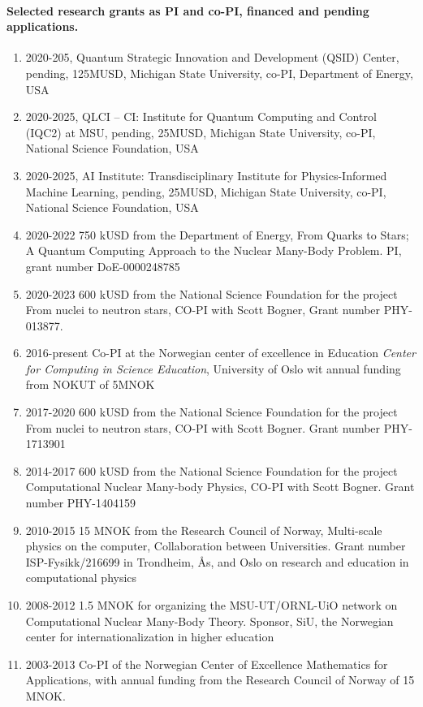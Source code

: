 \documentclass[%
oneside,                 %
final,                   %
10pt]{article}
\begin{document}
\paragraph{Selected research grants as PI and co-PI, financed and pending applications.}
\begin{enumerate}
\item 2020-205, Quantum Strategic Innovation and Development (QSID) Center, pending, 125MUSD, Michigan State University, co-PI, Department of Energy, USA

\item 2020-2025, QLCI – CI: Institute for Quantum Computing and Control (IQC2) at MSU, pending, 25MUSD, Michigan State University, co-PI, National Science Foundation, USA

\item 2020-2025, AI Institute:  Transdisciplinary Institute for Physics-Informed Machine Learning, pending, 25MUSD, Michigan State University, co-PI, National Science Foundation, USA

\item 2020-2022 750 kUSD from the Department of Energy, From Quarks to Stars; A Quantum Computing Approach to the Nuclear Many-Body Problem. PI, grant number DoE-0000248785  

\item 2020-2023 600 kUSD from the National Science Foundation for the project From nuclei to neutron stars, CO-PI with Scott Bogner, Grant number PHY-013877. 

\item 2016-present Co-PI  at the Norwegian center of excellence in Education \emph{Center for Computing in Science Education}, University of Oslo wit annual funding from NOKUT of 5MNOK

\item 2017-2020 600 kUSD from the National Science Foundation for the project From nuclei to neutron stars, CO-PI with Scott Bogner. Grant number PHY-1713901

\item 2014-2017 600 kUSD from the National Science Foundation for the project Computational Nuclear Many-body Physics, CO-PI with Scott Bogner. Grant number PHY-1404159

\item 2010-2015 15 MNOK from the Research Council of Norway, Multi-scale physics on the computer, Collaboration between Universities. Grant number ISP-Fysikk/216699 in Trondheim, Ås, and Oslo on research and education in computational physics

\item 2008-2012 1.5 MNOK for organizing the MSU-UT/ORNL-UiO network on Computational Nuclear Many-Body Theory. Sponsor, SiU, the Norwegian center for internationalization in higher education

\item 2003-2013 Co-PI of the Norwegian Center of Excellence Mathematics for Applications, with annual funding from the Research Council of Norway of 15 MNOK.
\end{enumerate}

\noindent


\end{document}

